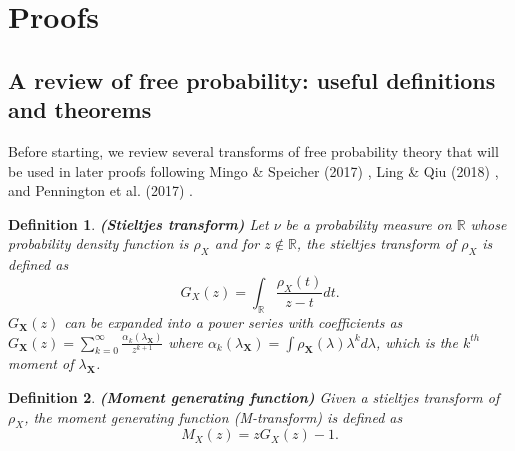 \documentclass[10pt,journal,compsoc]{IEEEtran}
\newtheorem{definition}{Definition}[section]
\begin{document}
\ifCLASSOPTIONcaptionsoff
  \newpage
\fi











\clearpage

\appendices
\section{Proofs}






\subsection{A review of free probability: useful definitions and theorems}
Before starting, we review several transforms of free probability theory that will be used in later proofs following Mingo \& Speicher (2017) \cite{mingo2017free}, Ling \& Qiu (2018) \cite{ling2018spectrum}, and Pennington et al. (2017) \cite{pennington2017resurrecting}.

\begin{definition}
\textbf{(Stieltjes transform)} Let $\nu$ be a probability measure on $\mathbb{R}$ whose probability density function is $\rho_X$ and for $z \notin \mathbb{R}$, the stieltjes transform of $\rho_X$ is defined as
\begin{equation}
    G_X(z) = \int_{\mathbb{R}}\frac{\rho_X(t)}{z-t}dt.
\label{equ:stieltjes transform}
\end{equation}
$G_{\mathbf{X}}(z)$ can be expanded into a power series with coefficients as $G_{\mathbf{X}}(z)=\sum_{k=0}^{\infty}\frac{\alpha_k(\lambda_{\mathbf{X}})}{z^{k+1}}$ where $\alpha_k(\lambda_{\mathbf{X}})=\int  \rho_{\mathbf{X}}(\lambda)\lambda^k d\lambda$, which is the $k^{th}$ moment of $\lambda_{\mathbf{X}}$. \cite{ling2018spectrum, pennington2017resurrecting}
\label{def:stieltjes_transform}
\end{definition}

\begin{definition}
\textbf{(Moment generating function)} Given a stieltjes transform of $\rho_X$, the moment generating function (M-transform) is defined as
\begin{equation}
    M_X(z) = zG_X(z) - 1.
\label{equ:M-transform}
\end{equation}
\label{def:M-transform}
\end{definition}
\end{document}
